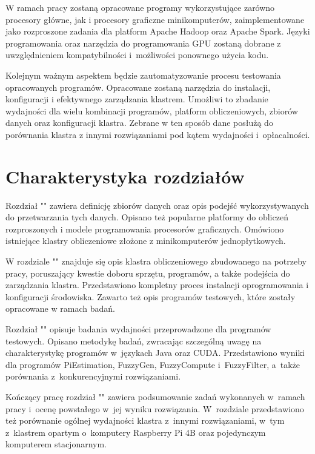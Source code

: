 W ramach pracy zostaną opracowane programy wykorzystujące zarówno procesory główne, jak
i procesory graficzne minikomputerów, zaimplementowane jako rozproszone zadania dla platform
Apache Hadoop oraz Apache Spark. Języki programowania oraz narzędzia do programowania GPU zostaną
dobrane z uwzględnieniem kompatybilności i~możliwości ponownego użycia kodu.

Kolejnym ważnym aspektem będzie zautomatyzowanie procesu testowania opracowanych programów.
Opracowane zostaną narzędzia do instalacji, konfiguracji i efektywnego zarządzania klastrem.
Umożliwi to zbadanie wydajności dla wielu kombinacji programów, platform obliczeniowych,
zbiorów danych oraz konfiguracji klastra. Zebrane w ten sposób dane posłużą do porównania
klastra z innymi rozwiązaniami pod kątem wydajności i~opłacalności.

\section*{Charakterystyka rozdziałów}

Rozdział "" zawiera definicję zbiorów danych  oraz opis
podejść wykorzystywanych do przetwarzania tych danych. Opisano też popularne platformy do obliczeń
rozproszonych i modele programowania procesorów graficznych. Omówiono istniejące klastry obliczeniowe
złożone z minikomputerów jednopłytkowych.

W rozdziale "" znajduje się opis klastra obliczeniowego zbudowanego
na potrzeby pracy, poruszający kwestie doboru sprzętu, programów, a także podejścia do zarządzania
klastra. Przedstawiono kompletny proces instalacji oprogramowania i konfiguracji środowiska.
Zawarto też opis programów testowych, które zostały opracowane w ramach badań.

Rozdział "" opisuje badania wydajności przeprowadzone dla programów testowych.
Opisano metodykę badań, zwracając szczególną uwagę na charakterystykę programów w~językach Java
oraz CUDA. Przedstawiono wyniki dla programów PiEstimation, FuzzyGen, FuzzyCompute i~FuzzyFilter,
a~także porównania z~konkurencyjnymi rozwiązaniami.

Kończący pracę rozdział "" zawiera podsumowanie zadań wykonanych w~ramach
pracy i~ocenę powstałego w~jej wyniku rozwiązania. W~rozdziale przedstawiono też porównanie ogólnej
wydajności klastra z~innymi rozwiązaniami, w~tym z~klastrem opartym o~komputery Raspberry Pi 4B
oraz pojedynczym komputerem stacjonarnym.
